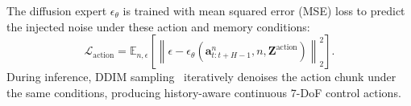 The diffusion expert $\epsilon_\theta$ is trained with mean squared error (MSE) loss to predict the injected noise under these action and memory conditions:
\begin{equation}
    \label{eq:diffusion_loss}
    \mathcal{L}_\text{action}
    =
    \mathbb{E}_{n,\epsilon}
    \left[
    \left\|
    \epsilon -
        \epsilon_\theta(\bm{a}_{t:t+H-1}^{n}, n, \bm{Z}^\text{action})
    \right\|_2^2
    \right].
\end{equation}
During inference, DDIM sampling~\cite{songdenoising} iteratively denoises the action chunk under the same conditions, producing history-aware continuous $7$-DoF control actions.
